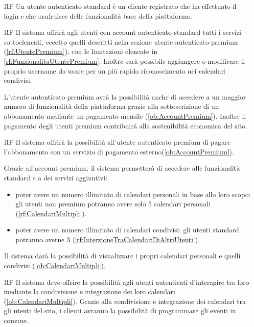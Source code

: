 \begin{listaPersonale}{RF}
	 Un utente autenticato standard è un cliente registrato che ha effettuato il login e che usufruisce delle funzionalità base della piattaforma.
	\begin{listaPersonale2}{RF}
		 Il sistema offrirà agli utenti con account autenticato-standard tutti i servizi sottoelencati, eccetto quelli descritti nella sezione utente autenticato-premium (\ref{rf:UtentePremium}), con le limitazioni elencate in \ref{rf:FunzionalitaUtentePremium}. Inoltre sarà possibile aggiungere o modificare il proprio username da usare per un più rapido riconoscimento nei calendari condivisi.
	\end{listaPersonale2}

	 L'utente autenticato premium avrà la possibilità anche di accedere a un maggior numero di funzionalità della piattaforma grazie alla sottoscrizione di un abbonamento mediante un pagamento mensile (\ref{ob:AccountPremium}). Inoltre il pagamento degli utenti premium contribuirà alla sostenibilità economica del sito.
	\begin{listaPersonale2}{RF}
		 Il sistema offrirà la possibilità all'utente autenticato premium di pagare l'abbonamento con un servizio di pagamento esterno(\ref{ob:AccountPremium}).

		 Grazie all'account premium, il sistema permetterà di accedere alle funzionalità standard e a dei servizi aggiuntivi:
		\begin{itemize}
			\item poter avere un numero illimitato di calendari personali in base allo loro scopo: gli utenti non premium potranno avere solo 5 calendari personali (\ref{rf:CalendariMultipli}).
			\item poter avere un numero illimitato di calendari condivisi: gli utenti standard potranno averne 3 (\ref{rf:InterzioneTraCalendariDiAltriUtenti}).
		\end{itemize}
	\end{listaPersonale2}

	 Il sistema darà la possibilità di visualizzare i propri calendari personali e quelli condivisi (\ref{ob:CalendariMultipli}).
	\begin{listaPersonale2}{RF}
		 Il sistema deve offrire la possibilità agli utenti autenticati d'interagire tra loro mediante la condivisione e integrazione dei loro calendari (\ref{ob:CalendariMultipli}). Grazie alla condivisione e integrazione dei calendari tra gli utenti del sito, i clienti avranno la possibilità di programmare gli eventi in comune.


\end{listaPersonale2}
\end{listaPersonale}

